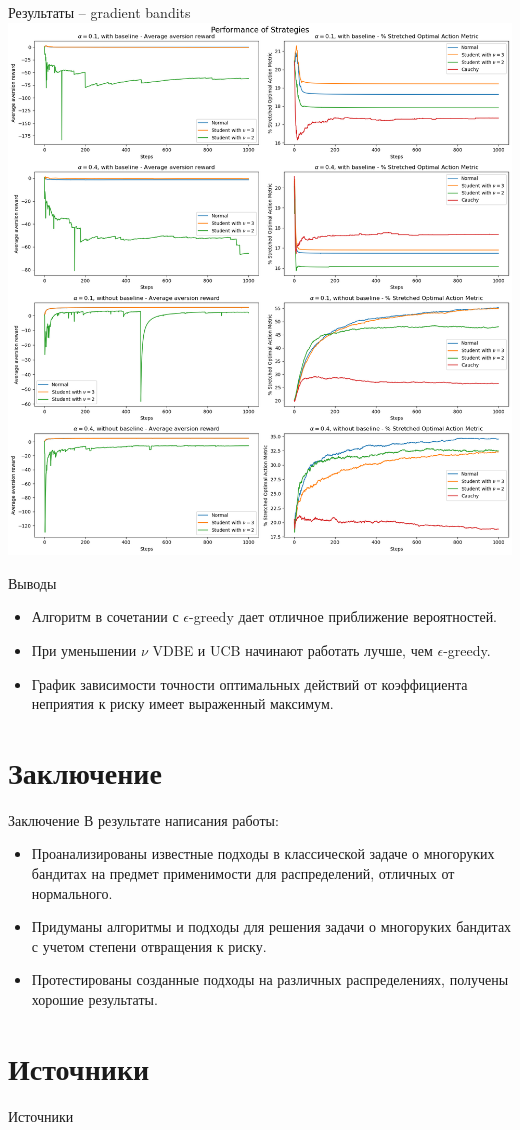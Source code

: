 \documentclass[11pt]{beamer} %
\begin{document}
    \begin{frame}{Результаты -- gradient bandits}
        \includegraphics[scale=0.13,center]{images/theory_images/gradient_bandits/one_strat.png}
    \end{frame}
    \begin{frame}{Выводы}
        \begin{itemize}
            \item<1-> Алгоритм в сочетании с $\epsilon$-greedy дает отличное приближение вероятностей.
            \item<2-> При уменьшении $\nu$ VDBE и UCB начинают работать лучше, чем $\epsilon$-greedy.
            \item<3-> График зависимости точности оптимальных действий от коэффициента неприятия к риску имеет выраженный максимум.
        \end{itemize}
    \end{frame}

\section{Заключение}
    \begin{frame}{Заключение}
        В результате написания работы:
        \begin{itemize}
            \item<1-> Проанализированы известные подходы в классической задаче о многоруких бандитах на предмет применимости для распределений, отличных от нормального.
            \item<2-> Придуманы алгоритмы и подходы для решения задачи о многоруких бандитах с учетом степени отвращения к риску.
            \item<3-> Протестированы созданные подходы на различных распределениях, получены хорошие результаты.
        \end{itemize}
    \end{frame}

\section{Источники}
    \begin{frame}{Источники}
        \printbibliography
    \end{frame}
\end{document}

